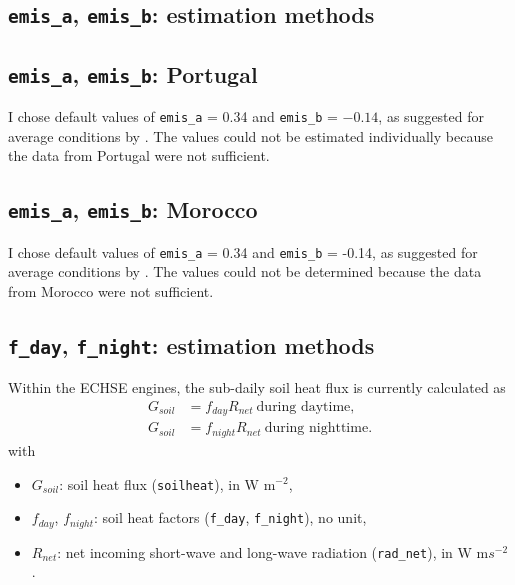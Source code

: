 \documentclass{scrreprt}
\begin{document}
\subsection{\texttt{emis\_a}, \texttt{emis\_b}: estimation methods} \label{ssec:parest_rad_emismethods}

\subsection{\texttt{emis\_a}, \texttt{emis\_b}: Portugal} \label{ssec:parest_rad_emisportugal}

I chose default values of \verb!emis_a! = 0.34 and \verb!emis_b! = $-0.14$, as suggested for average conditions by \citet{maidment93}.
The values could not be estimated individually because the data from Portugal were not sufficient.

\subsection{\texttt{emis\_a}, \texttt{emis\_b}: Morocco} \label{ssec:parest_rad_emismorocco}

I chose default values of \verb!emis_a! = 0.34 and \verb!emis_b! = -0.14, as suggested for average conditions by \citet{maidment93}.
The values could not be determined because the data from Morocco were not sufficient.

\subsection{\texttt{f\_day}, \texttt{f\_night}: estimation methods} \label{ssec:parest_rad_fmethods}

Within the ECHSE engines, the sub-daily soil heat flux is currently calculated as
\begin{align}
  G_{soil} &= f_{day} R_{net} ~ \text{during daytime}, \label{eq:F1} \\
  G_{soil} &= f_{night} R_{net} ~ \text{during nighttime}. \label{eq:F2}
\end{align}
%
with
\begin{itemize}
  \item[] $G_{soil}$: soil heat flux (\verb!soilheat!), in W m$^{-2}$,
  \item[] $f_{day}$, $f_{night}$: soil heat factors (\verb!f_day!, \verb!f_night!), no unit,
  \item[] $R_{net}$: net incoming short-wave and long-wave radiation (\verb!rad_net!), in W m$s^{-2}$.
\end{itemize}
\end{document}
